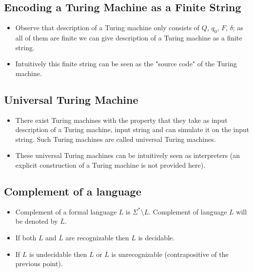 \documentclass[
11pt,notheorems,hyperref={pdfauthor=whatever}
]{beamer}
\begin{document}
\subsection{Encoding a Turing Machine as a Finite String}
\begin{frame}
\begin{itemize}
    \item Observe that description of a Turing machine only consists of $Q$, $q_0$, $F$, $\delta$; as all of them are finite we can give description of a Turing machine as a finite string.
    \item Intuitively this finite string can be seen as the "source code" of the Turing machine.
\end{itemize}
\end{frame}

\subsection{Universal Turing Machine}
\begin{frame}
\begin{itemize}
    \item There exist Turing machines with the property that they take as input description of a Turing machine, input string and can simulate it on the input string. Such Turing machines are called universal Turing machines.
    \item These universal Turing machines can be intuitively seen as interpreters (an explicit construction of a Turing machine is not provided here).
\end{itemize}
\end{frame}

\subsection{Complement of a language}
\begin{frame}
\begin{itemize}
    \item Complement of a formal language $L$ is $\Sigma^* \setminus L$. Complement of language $L$ will be denoted by $\overline{L}$.
    \item If both $L$ and $\overline{L}$ are recognizable then $L$ is decidable.
    \item If $L$ is undecidable then $L$ or $\overline{L}$ is unrecognizable (contrapositive of the previous point).
\end{itemize}
\end{frame}
\end{document}
